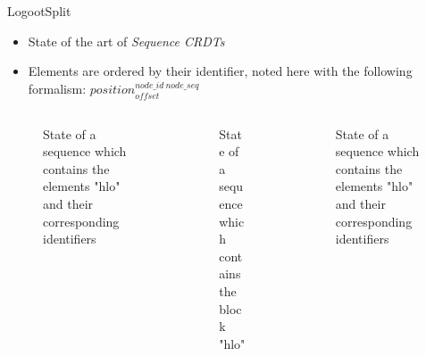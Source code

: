 \documentclass[10pt]{beamer}
\newcommand{\trm}[1]{\mathit{#1}}
\newcommand{\id}[3]{$\trm{#1}^{\trm{#2}}_{\trm{#3}}$}
\newcommand{\widthletter}{2em}
\begin{document}
\begin{frame}{LogootSplit }
  \begin{itemize}
    \item State of the art of \emph{Sequence \acp{CRDT}}
    \item Elements are ordered by their identifier, noted here with the following formalism: \id{position}{node\_id~node\_seq}{offset}
  \end{itemize}

  \pause

  \begin{columns}
    \begin{column}{0.33\textwidth}
      \begin{figure}
        \centering
        \caption{State of a sequence which contains the elements "hlo" and their corresponding identifiers}
      \end{figure}
    \end{column}
    \pause
    \begin{column}{0.33\textwidth}
      \vspace{-9mm}
      \begin{figure}
        \centering
        \caption{State of a sequence which contains the block "hlo"}
      \end{figure}
    \end{column}
    \pause
    \begin{column}{0.33\textwidth}
      \begin{figure}
        \vspace{-7mm}
        \centering
        \caption{State of a sequence which contains the elements "hlo" and their corresponding identifiers}
      \end{figure}
    \end{column}
  \end{columns}
\end{frame}
\end{document}
